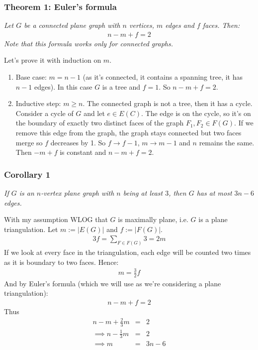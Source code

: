 \documentclass[11pt]{book}
\begin{document}
		
		\subsubsection{Theorem 1: Euler's formula}
		\textit{Let $G$ be a connected plane graph with $n$ vertices, $m$ edges and $f$ faces. Then:}
		\begin{eqnarray}
			n - m + f = 2
		\end{eqnarray}
		\textit{Note that this formula works only for connected graphs.\\}
		
		Let's prove it with induction on $m$.
		\begin{enumerate}
			\item Base case: $m = n -1$ (as it's connected, it contains a spanning tree, it has $n - 1$ edges). In this case $G$ is a tree and $f = 1$. So $n - m + f = 2$.
			\item Inductive step: $m \geq n$. The connected graph is not a tree, then it has a cycle. Consider a cycle of $G$ and let $e \in E(C)$. The edge is on the cycle, so it's on the boundary of exactly two distinct faces of the graph $F_1, F_2 \in F(G)$. If we remove this edge from the graph, the graph stays connected but two faces merge so $f$ decreases by 1. So $f \rightarrow f -1$, $m \rightarrow m - 1$ and $n$ remains the same. Then $-m + f$ is constant and $n -m + f = 2$.
		\end{enumerate}
		
		\subsubsection{Corollary 1} 
		\textit{If $G$ is an $n$-vertex plane graph with $n$ being at least $3$, then $G$ has at most $3n - 6$ edges.}
		
		With my assumption WLOG that $G$ is maximally plane, i.e. $G$ is a plane triangulation. Let $m := |E(G)|$ and $f := |F(G)|$.
		\begin{eqnarray}
			3f = \sum_{F \in F(G)} 3 = 2m
		\end{eqnarray}
		If we look at every face in the triangulation, each edge will be counted two times as it is boundary to two faces. Hence:
		\begin{eqnarray}
			m = \frac{3}{2} f
		\end{eqnarray}
		And by Euler's formula (which we will use as we're considering a plane triangulation):
		\begin{eqnarray}
			n - m + f = 2
		\end{eqnarray}
		Thus 
		\begin{eqnarray}
			n - m + \frac{2}{3}m &=& 2 \\
			\implies n - \frac{1}{3} m &=& 2 \\
			\implies m &=& 3n - 6
		\end{eqnarray}
		
\end{document}
